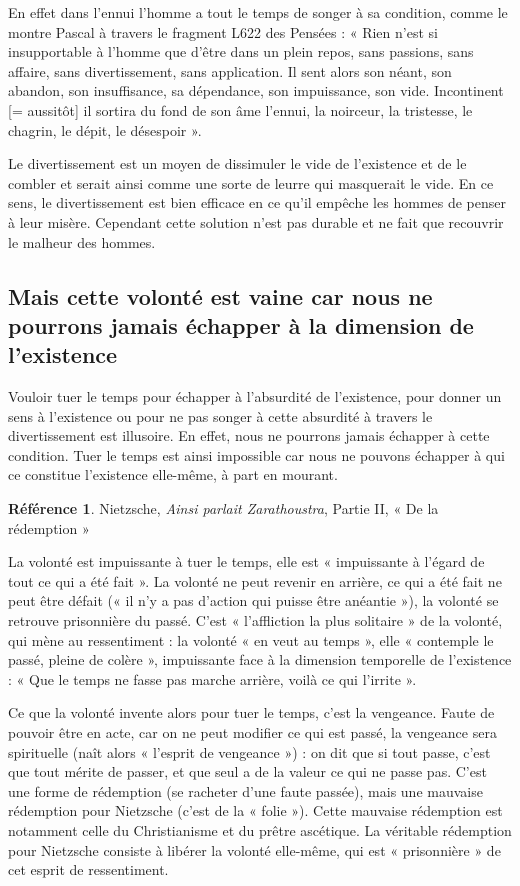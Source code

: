 \documentclass[french]{book}
\theoremstyle{definition}
\newtheorem*{refe}{Référence}
\begin{document}
En effet dans l’ennui l’homme a tout le temps de songer à sa condition, comme le montre Pascal à travers le fragment L622 des Pensées : « Rien n’est si insupportable à l’homme que d’être dans un plein repos, sans passions, sans affaire, sans divertissement, sans application. Il sent alors son néant, son abandon, son insuffisance, sa dépendance, son impuissance, son vide. Incontinent [= aussitôt] il sortira du fond de son âme l’ennui, la noirceur, la tristesse, le chagrin, le dépit, le désespoir ».

Le divertissement est un moyen de dissimuler le vide de l’existence et de le combler et serait ainsi comme une sorte de leurre qui masquerait le vide. En ce sens, le divertissement est bien efficace en ce qu’il empêche les hommes de penser à leur misère. Cependant cette solution n’est pas durable et ne fait que recouvrir le malheur des hommes.

\subsection{Mais cette volonté est vaine car nous ne pourrons jamais échapper à la dimension de l’existence}

Vouloir tuer le temps pour échapper à l’absurdité de l’existence, pour donner un sens à l’existence ou pour ne pas songer à cette absurdité à travers le divertissement est illusoire. En effet, nous ne pourrons jamais échapper à cette condition.
Tuer le temps est ainsi impossible car nous ne pouvons échapper à qui ce constitue  l’existence elle-même, à part en mourant.

\begin{refe}
	Nietzsche, \textit{Ainsi parlait Zarathoustra}, Partie II, « De la rédemption »
\end{refe}

La volonté est impuissante à tuer le temps, elle est « impuissante à l’égard de tout ce qui a été fait ». La volonté ne peut revenir en arrière, ce qui a été fait ne peut être défait (« il n’y a pas d’action qui puisse être anéantie »), la volonté se retrouve prisonnière du passé. C’est « l’affliction la plus solitaire » de la volonté, qui mène au ressentiment : la volonté « en veut au temps », elle « contemple le passé, pleine de colère », impuissante face à la dimension temporelle de l’existence : « Que le temps ne fasse pas marche arrière, voilà ce qui l’irrite ».

Ce que la volonté invente alors pour tuer le temps, c’est la vengeance. Faute de pouvoir être en acte, car on ne peut modifier ce qui est passé, la vengeance sera spirituelle (naît alors « l’esprit de vengeance ») : on dit que si tout passe, c’est que tout mérite de passer, et que seul a de la valeur ce qui ne passe pas. C’est une forme de rédemption (se racheter d’une faute passée), mais une mauvaise rédemption pour Nietzsche (c’est de la « folie »). Cette mauvaise rédemption est notamment celle du Christianisme et du prêtre ascétique. La véritable rédemption pour Nietzsche consiste à libérer la volonté elle-même, qui est « prisonnière » de cet esprit de ressentiment. 
\end{document}
